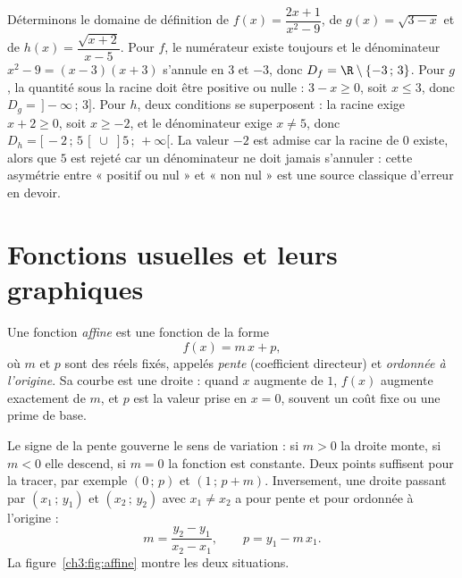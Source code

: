 \begin{exemple}
Déterminons le domaine de définition de $f(x) = \dfrac{2x+1}{x^{2}-9}$, de $g(x) = \sqrt{3-x}$ et de $h(x) = \dfrac{\sqrt{x+2}}{x-5}$. Pour $f$, le numérateur existe toujours et le dénominateur $x^{2} - 9 = (x-3)(x+3)$ s'annule en $3$ et $-3$, donc $D_f = \R \setminus \{-3\,;\,3\}$. Pour $g$, la quantité sous la racine doit être positive ou nulle : $3 - x \geq 0$, soit $x \leq 3$, donc $D_g = \,]-\infty\,;\,3]$. Pour $h$, deux conditions se superposent : la racine exige $x + 2 \geq 0$, soit $x \geq -2$, et le dénominateur exige $x \neq 5$, donc $D_h = [\,-2\,;\,5\,[\;\cup\;]5\,;\,+\infty[$. La valeur $-2$ est admise car la racine de $0$ existe, alors que $5$ est rejeté car un dénominateur ne doit jamais s'annuler : cette asymétrie entre « positif ou nul » et « non nul » est une source classique d'erreur en devoir.
\end{exemple}

\section{Fonctions usuelles et leurs graphiques}

\begin{definition}
Une fonction \emph{affine} est une fonction de la forme
\[
f(x) = m\,x + p,
\]
où $m$ et $p$ sont des réels fixés, appelés \emph{pente} (coefficient directeur) et \emph{ordonnée à l'origine}. Sa courbe est une droite : quand $x$ augmente de $1$, $f(x)$ augmente exactement de $m$, et $p$ est la valeur prise en $x = 0$, souvent un coût fixe ou une prime de base.
\end{definition}

Le signe de la pente gouverne le sens de variation : si $m > 0$ la droite monte, si $m < 0$ elle descend, si $m = 0$ la fonction est constante. Deux points suffisent pour la tracer, par exemple $(0\,;\,p)$ et $(1\,;\,p+m)$. Inversement, une droite passant par $(x_1\,;\,y_1)$ et $(x_2\,;\,y_2)$ avec $x_1 \neq x_2$ a pour pente et pour ordonnée à l'origine :
\[
m = \frac{y_2 - y_1}{x_2 - x_1}, \qquad p = y_1 - m\,x_1.
\]
La figure~\ref{ch3:fig:affine} montre les deux situations.

\begin{center}
\label{ch3:fig:affine}
\end{center}

